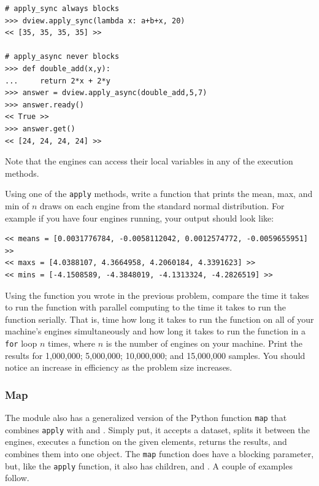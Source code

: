\begin{lstlisting}
# apply_sync always blocks
>>> dview.apply_sync(lambda x: a+b+x, 20)
<< [35, 35, 35, 35] >>

# apply_async never blocks
>>> def double_add(x,y):
...     return 2*x + 2*y
>>> answer = dview.apply_async(double_add,5,7)
>>> answer.ready()
<< True >>
>>> answer.get()
<< [24, 24, 24, 24] >>
\end{lstlisting}

Note that the engines can access their local variables in any of the execution methods.

\begin{problem}
Using one of the \texttt{apply} methods, write a function  that prints the mean, max, and min of $n$ draws on each engine from the standard normal distribution.
For example if you have four engines running, your output should look like:
\begin{lstlisting}
<< means = [0.0031776784, -0.0058112042, 0.0012574772, -0.0059655951] >>
<< maxs = [4.0388107, 4.3664958, 4.2060184, 4.3391623] >>
<< mins = [-4.1508589, -4.3848019, -4.1313324, -4.2826519] >>
\end{lstlisting}
\end{problem}


\begin{problem}
Using the function you wrote in the previous problem, compare the time it takes to run the function with parallel computing to the time it takes to run the function serially.
That is, time how long it takes to run the function on all of your machine's engines simultaneously and how long it takes to run the function in a \texttt{for} loop $n$ times, where $n$ is the number of engines on your machine.
Print the results for 1,000,000; 5,000,000; 10,000,000; and 15,000,000 samples.
You should notice an increase in efficiency as the problem size increases.
\end{problem}

\subsubsection*{Map}
The  module also has a generalized version of the Python function \texttt{map} that combines \texttt{apply} with  and .
Simply put, it accepts a dataset, splits it between the engines, executes a function on the given elements, returns the results, and combines them into one object.
The \texttt{map} function does have a blocking parameter, but, like the \texttt{apply} function, it also has children,  and .
A couple of examples follow.

